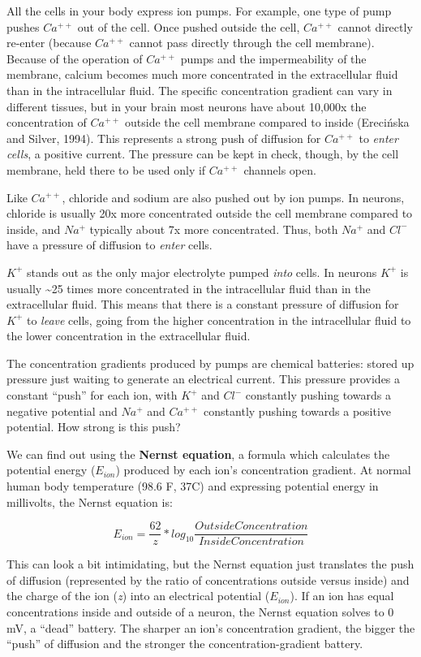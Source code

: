 \documentclass[
]{book}
\begin{document}
All the cells in your body express ion pumps. For example, one type of pump pushes \(Ca^{++}\) out of the cell. Once pushed outside the cell, \(Ca^{++}\) cannot directly re-enter (because \(Ca^{++}\) cannot pass directly through the cell membrane). Because of the operation of \(Ca^{++}\) pumps and the impermeability of the membrane, calcium becomes much more concentrated in the extracellular fluid than in the intracellular fluid. The specific concentration gradient can vary in different tissues, but in your brain most neurons have about 10,000x the concentration of \(Ca^{++}\) outside the cell membrane compared to inside (Erecińska and Silver, 1994). This represents a strong push of diffusion for \(Ca^{++}\) to \emph{enter cells}, a positive current. The pressure can be kept in check, though, by the cell membrane, held there to be used only if \(Ca^{++}\) channels open.

Like \(Ca^{++}\), chloride and sodium are also pushed out by ion pumps. In neurons, chloride is usually 20x more concentrated outside the cell membrane compared to inside, and \(Na^+\) typically about 7x more concentrated. Thus, both \(Na^+\) and \(Cl^{-}\) have a pressure of diffusion to \emph{enter} cells.

\(K^+\) stands out as the only major electrolyte pumped \emph{into} cells. In neurons \(K^+\) is usually \textasciitilde25 times more concentrated in the intracellular fluid than in the extracellular fluid. This means that there is a constant pressure of diffusion for \(K^+\) to \emph{leave} cells, going from the higher concentration in the intracellular fluid to the lower concentration in the extracellular fluid.

The concentration gradients produced by pumps are chemical batteries: stored up pressure just waiting to generate an electrical current. This pressure provides a constant ``push'' for each ion, with \(K^+\) and \(Cl^{-}\) constantly pushing towards a negative potential and \(Na^+\) and \(Ca^{++}\) constantly pushing towards a positive potential. How strong is this push?

We can find out using the \textbf{Nernst equation}, a formula which calculates the potential energy (\(E_{ion}\)) produced by each ion's concentration gradient. At normal human body temperature (98.6 F, 37C) and expressing potential energy in millivolts, the Nernst equation is:

\[E_{ion} = \frac{62}{z}*log_{10}\frac{OutsideConcentration}{Inside Concentration}\]

This can look a bit intimidating, but the Nernst equation just translates the push of diffusion (represented by the ratio of concentrations outside versus inside) and the charge of the ion (\emph{z}) into an electrical potential (\(E_{ion}\)). If an ion has equal concentrations inside and outside of a neuron, the Nernst equation solves to 0 mV, a ``dead'' battery. The sharper an ion's concentration gradient, the bigger the ``push'' of diffusion and the stronger the concentration-gradient battery.
\end{document}
